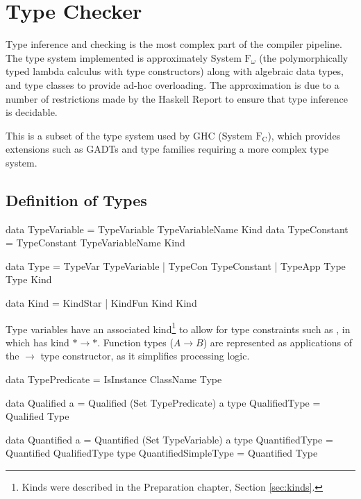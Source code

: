 \documentclass[dissertation.tex]{subfiles}
\begin{document}
\section{Type Checker}
{
    Type inference and checking is the most complex part of the compiler pipeline. The type system implemented is approximately System \(\text{F}_\omega\) (the polymorphically typed lambda calculus with type constructors) along with algebraic data types, and type classes to provide ad-hoc overloading. The approximation is due to a number of restrictions made by the Haskell Report to ensure that type inference is decidable.
    
    This is a subset of the type system used by GHC (System \(\text{F}_\text{C}\)), which provides extensions such as GADTs and type families requiring a more complex type system.

    \subsection{Definition of Types}
    {
        \begin{haskellfigure}
        data TypeVariable = TypeVariable TypeVariableName Kind
        data TypeConstant = TypeConstant TypeVariableName Kind

        data Type = TypeVar TypeVariable
                  | TypeCon TypeConstant
                  | TypeApp Type Type Kind

        data Kind = KindStar
                  | KindFun Kind Kind
        \end{haskellfigure}

        Type variables have an associated kind\footnote{Kinds were described in the Preparation chapter, Section \ref{sec:kinds}.} to allow for type constraints such as , in which  has kind \(*\rightarrow*\). Function types (\(A \rightarrow B\)) are represented as applications of the \(\rightarrow\) type constructor, as it simplifies processing logic.

        \begin{haskellfigure}
        data TypePredicate = IsInstance ClassName Type

        data Qualified a = Qualified (Set TypePredicate) a
        type QualifiedType = Qualified Type

        data Quantified a = Quantified (Set TypeVariable) a
        type QuantifiedType = Quantified QualifiedType
        type QuantifiedSimpleType = Quantified Type
        \end{haskellfigure}

}}
\end{document}
